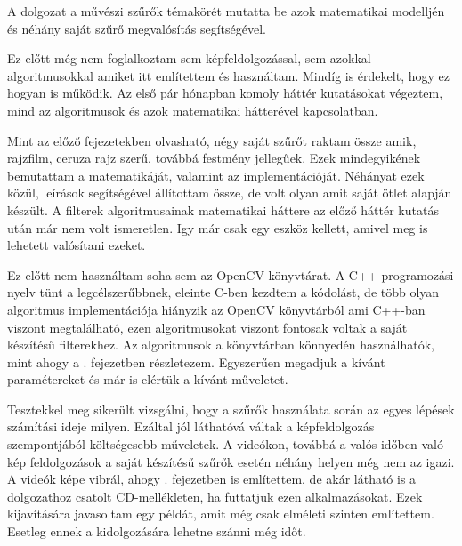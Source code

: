 

A dolgozat a művészi szűrők témakörét mutatta be azok matematikai modelljén és néhány saját szűrő megvalósítás segítségével.

Ez előtt még nem foglalkoztam sem képfeldolgozással, sem azokkal algoritmusokkal amiket itt említettem és használtam. Mindíg is érdekelt, hogy ez hogyan is működik. Az első pár hónapban komoly háttér kutatásokat végeztem, mind az algoritmusok és azok matematikai hátterével kapcsolatban.

Mint az előző fejezetekben olvasható, négy saját szűrőt raktam össze amik, rajzfilm, ceruza rajz szerű, továbbá festmény jellegűek. Ezek mindegyikének bemutattam a matematikáját, valamint az implementációját.  Néhányat ezek közül, leírások segítségével állítottam össze, de volt olyan amit saját ötlet alapján készült. A filterek algoritmusainak matematikai háttere az előző háttér kutatás után már nem volt ismeretlen. Igy már csak egy eszköz kellett, amivel meg is lehetett valósítani ezeket. 

Ez előtt nem használtam soha sem az OpenCV könyvtárat. A C++ programozási nyelv tünt a legcélszerűbbnek, eleinte C-ben kezdtem a kódolást, de több olyan algoritmus implementációja hiányzik az OpenCV könyvtárból ami C++-ban viszont megtalálható, ezen algoritmusokat viszont fontosak voltak a saját készítésű filterekhez. Az algoritmusok a könyvtárban könnyedén használhatók, mint ahogy a . fejezetben részletezem. Egyszerűen megadjuk a kívánt paramétereket és már is elértük a kívánt műveletet.

Tesztekkel meg sikerült vizsgálni, hogy a szűrők használata során az egyes lépések számítási ideje milyen. Ezáltal jól láthatóvá váltak a képfeldolgozás szempontjából költségesebb műveletek. A videókon, továbbá a valós időben való kép feldolgozások a saját készítésű szűrők esetén néhány helyen még nem az igazi. A videók képe vibrál, ahogy . fejezetben is említettem, de akár látható is a dolgozathoz csatolt CD-mellékleten, ha futtatjuk ezen alkalmazásokat. Ezek kijavítására javasoltam egy példát, amit még csak elméleti szinten említettem. Esetleg ennek a kidolgozására lehetne szánni még időt.
